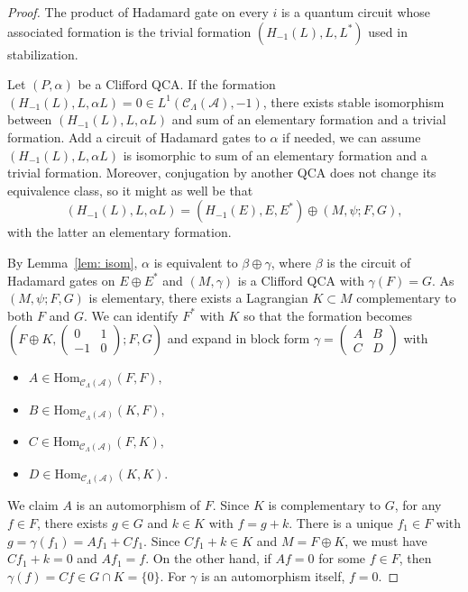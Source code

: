 \documentclass{article}
\theoremstyle{definition}
\newcommand{\Hom}{\mathrm{Hom}}
\newcommand{\CA}{{ \mathcal A}}
\def \al {\alpha}
\begin{document}
\begin{proof}
     The product of Hadamard gate on every $i$ is a quantum circuit whose associated formation is the trivial formation $(H_{-1}(L), L, L^*)$ used in stabilization. 

    
    Let $(P, \alpha)$ be a Clifford QCA. If the formation $(H_{-1}(L), L, \alpha L)=0\in L^1(\mathcal{C}_{\Lambda}(\CA), -1)$, there exists stable isomorphism between $(H_{-1}(L), L, \alpha L)$ and sum of an elementary formation and a trivial formation. Add a circuit of Hadamard gates to $\al$ if needed, we can assume $(H_{-1}(L), L, \alpha L)$ is isomorphic to sum of an elementary formation and a trivial formation. Moreover, conjugation by another QCA does not change its equivalence class, so it might as well be that 
    $$(H_{-1}(L), L, \alpha L)=(H_{-1}(E), E, E^*)\oplus (M, \psi; F, G),$$ with the latter an elementary formation.

By Lemma~\ref{lem: isom}, $\al$ is equivalent to $\beta\oplus \gamma$, where $\beta$ is the circuit of Hadamard gates on $E\oplus E^*$ and $(M, \gamma)$ is a Clifford QCA with $\gamma(F)=G$. As $(M, \psi; F, G)$ is elementary, there exists a Lagrangian $K\subset M$ complementary to both $F$ and $G$. We can identify $F^*$ with $K$ so that the formation becomes $\left(F\oplus K, \begin{pmatrix}
        0 & 1\\
        -1 & 0
    \end{pmatrix}; F, G\right)$ and expand in block form 
$\gamma=\begin{pmatrix}
        A & B\\
        C & D
    \end{pmatrix}$ with 
    \begin{itemize}
        \item $A\in \Hom_{\mathcal{C}_{\Lambda}(\CA)}(F, F),$
        \item $B\in \Hom_{\mathcal{C}_{\Lambda}(\CA)}(K, F),$
        \item $C\in \Hom_{\mathcal{C}_{\Lambda}(\CA)}(F, K),$
        \item $D\in \Hom_{\mathcal{C}_{\Lambda}(\CA)}(K, K).$
    \end{itemize} 
    We claim $A$ is an automorphism of $F$. Since $K$ is complementary to $G$, for any $f\in F$, there exists $g\in G$ and $k\in K$ with $f=g+k$. There is a unique $f_1\in F$ with $g=\gamma(f_1)=Af_1+Cf_1.$ Since $Cf_1+k\in K$ and $M=F\oplus K$, we must have $Cf_1+k=0$ and $Af_1=f$. On the other hand, if $Af=0$ for some $f\in F$, then $\gamma (f)=Cf\in G\cap K=\{0\}.$ For $\gamma$ is an automorphism itself, $f=0$. 


\end{proof}
\end{document}
